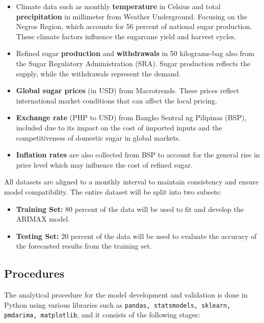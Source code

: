 \documentclass[11pt]{article}
\begin{document}
\begin{itemize}
    \item Climate data such as monthly \textbf{temperature} in Celsius and total \textbf{precipitation} in millimeter from Weather Underground. Focusing on the Negros Region, which accounts for 56 percent of national sugar production. These climate factors influence the sugarcane yield and harvest cycles.

    \item Refined sugar \textbf{production} and \textbf{withdrawals} in 50 kilograms-bag also from the Sugar Regulatory Administration (SRA).  Sugar production reflects the supply, while the withdrawals represent the demand.

    \item \textbf{Global sugar prices} (in USD) from Macrotrends. These prices reflect international market conditions that can affect the local pricing.

    \item \textbf{Exchange rate} (PHP to USD) from Bangko Sentral ng Pilipinas (BSP), included due to its impact on the cost of imported inputs and the competitiveness of domestic sugar in global markets. 

    \item \textbf{Inflation rates} are also collected from BSP to account for the general rise in price level which may influence the cost of refined sugar. 


\end{itemize}
All datasets are aligned to a monthly interval to maintain consistency and ensure model compatibility.  The entire dataset will be split into two subsets:
\begin{itemize}
    \item \textbf{Training Set:} 80 percent of the data will be used to fit and develop the ARIMAX model.
    \item \textbf{Testing Set:} 20 percent of the data will be used to evaluate the accuracy of the forecasted results from the training set. 
\end{itemize}

\subsection{Procedures}
The analytical procedure for the model development and validation is done in Python using various libraries such as \texttt{pandas, statsmodels, sklearn, pmdarima, matplotlib}, and it consists of the following stages: 
\end{document}
